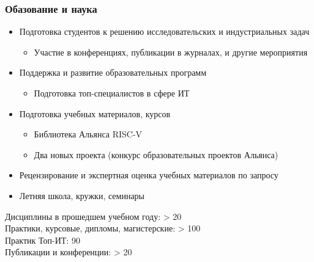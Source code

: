\documentclass[xcolor=table,aspectratio=169]{beamer}
\begin{document}
\begin{frame}[fragile]
  \frametitle{Обазование и наука}
  \begin{itemize}
      \item Подготовка студентов к решению исследовательских и индустриальных задач
      \begin{itemize}
        \item Участие в конференциях, публикации в журналах, и другие мероприятия 
      \end{itemize}
      \item Поддержка и развитие образовательных программ
      \begin{itemize}
        \item Подготовка топ-специалистов в сфере ИТ
      \end{itemize}
      \item Подготовка учебных материалов, курсов
      \begin{itemize}
        \item Библиотека Альянса RISC-V
        \item[\faGears] Два новых проекта (конкурс образовательных проектов Альянса) 
      \end{itemize}
      \item Рецензирование и экспертная оценка учебных материалов по запросу
      \item Летняя школа, кружки, семинары
  \end{itemize}
  \noindent\makebox[\linewidth]{\rule{\paperwidth}{0.4pt}}
    \begin{center}
      Дисциплины в прошедшем учебном году: > 20
      \\ Практики, курсовые, дипломы, магистерские: > 100
      \\ Практик Топ-ИТ: 90
      \\ Публикации и конференции: > 20
    \end{center}
\end{frame}
\end{document}
